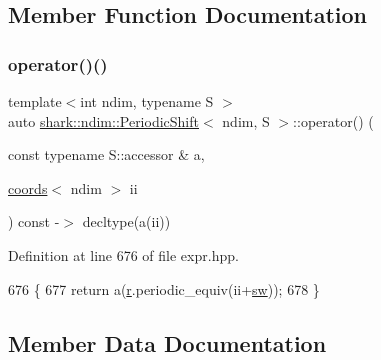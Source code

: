 \subsection{Member Function Documentation}
\hypertarget{classshark_1_1ndim_1_1_periodic_shift_acc2d3268c34e15655301843e4370a349}{}\label{classshark_1_1ndim_1_1_periodic_shift_acc2d3268c34e15655301843e4370a349} 
\subsubsection{\texorpdfstring{operator()()}{operator()()}}
{\footnotesize\ttfamily template$<$int ndim, typename S $>$ \\
auto \hyperlink{classshark_1_1ndim_1_1_periodic_shift}{shark\+::ndim\+::\+Periodic\+Shift}$<$ ndim, S $>$\+::operator() (\begin{DoxyParamCaption}\item[{const typename S\+::accessor \&}]{a,  }\item[{\hyperlink{structshark_1_1ndim_1_1coords}{coords}$<$ ndim $>$}]{ii }\end{DoxyParamCaption}) const -\/$>$ decltype(a(ii)) \hspace{0.3cm}{\ttfamily [inline]}}



Definition at line 676 of file expr.\+hpp.


\begin{DoxyCode}
676                                                                                                    \{
677                 \textcolor{keywordflow}{return} a(\hyperlink{classshark_1_1ndim_1_1_periodic_shift_ad2b058280d2b466c8acb82e6f473e240}{r}.periodic\_equiv(ii+\hyperlink{classshark_1_1ndim_1_1_periodic_shift_aded04c5bc0760cfb247590c85921b653}{sw}));
678             \}
\end{DoxyCode}


\subsection{Member Data Documentation}
\hypertarget{classshark_1_1ndim_1_1_periodic_shift_ad2b058280d2b466c8acb82e6f473e240}{}\label{classshark_1_1ndim_1_1_periodic_shift_ad2b058280d2b466c8acb82e6f473e240} 
